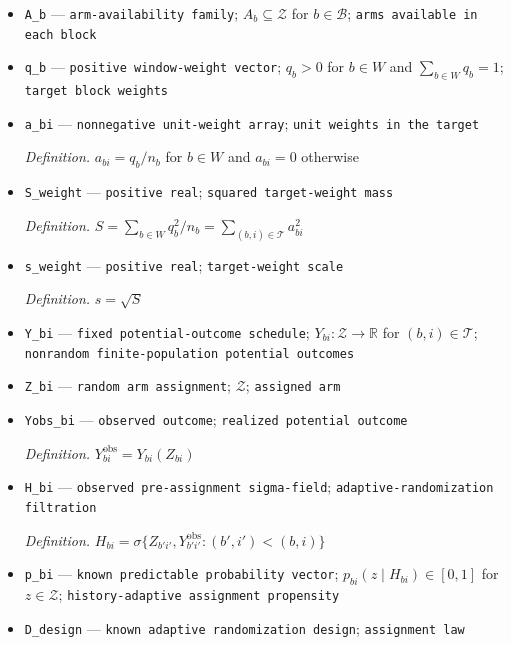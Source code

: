 \documentclass{article}
\begin{document}
\begin{itemize}
  \item \texttt{A\_\allowbreak{}b} --- \texttt{arm-\allowbreak{}availability family}; \(A_b\subseteq\mathcal Z\) for \(b\in\mathcal B\); \texttt{arms available in each block}
  \item \texttt{q\_\allowbreak{}b} --- \texttt{positive window-\allowbreak{}weight vector}; \(q_b>0\) for \(b\in W\) and \(\sum_{b\in W}q_b=1\); \texttt{target block weights}
  \item \texttt{a\_\allowbreak{}bi} --- \texttt{nonnegative unit-\allowbreak{}weight array}; \texttt{unit weights in the target}
  \par\smallskip\noindent\emph{Definition.} \(a_{bi}=q_b/n_b\) for \(b\in W\) and \(a_{bi}=0\) otherwise
  \item \texttt{S\_\allowbreak{}weight} --- \texttt{positive real}; \texttt{squared target-\allowbreak{}weight mass}
  \par\smallskip\noindent\emph{Definition.} \(S=\sum_{b\in W}q_b^2/n_b=\sum_{(b,i)\in\mathcal T}a_{bi}^2\)
  \item \texttt{s\_\allowbreak{}weight} --- \texttt{positive real}; \texttt{target-\allowbreak{}weight scale}
  \par\smallskip\noindent\emph{Definition.} \(s=\sqrt S\)
  \item \texttt{Y\_\allowbreak{}bi} --- \texttt{fixed potential-\allowbreak{}outcome schedule}; \(Y_{bi}:\mathcal Z\to\mathbb R\) for \((b,i)\in\mathcal T\); \texttt{nonrandom finite-\allowbreak{}population potential outcomes}
  \item \texttt{Z\_\allowbreak{}bi} --- \texttt{random arm assignment}; \(\mathcal Z\); \texttt{assigned arm}
  \item \texttt{Yobs\_\allowbreak{}bi} --- \texttt{observed outcome}; \texttt{realized potential outcome}
  \par\smallskip\noindent\emph{Definition.} \(Y^{\mathrm{obs}}_{bi}=Y_{bi}(Z_{bi})\)
  \item \texttt{H\_\allowbreak{}bi} --- \texttt{observed pre-\allowbreak{}assignment sigma-\allowbreak{}field}; \texttt{adaptive-\allowbreak{}randomization filtration}
  \par\smallskip\noindent\emph{Definition.} \(H_{bi}=\sigma\{Z_{b'i'},Y^{\mathrm{obs}}_{b'i'}:(b',i')<(b,i)\}\)
  \item \texttt{p\_\allowbreak{}bi} --- \texttt{known predictable probability vector}; \(p_{bi}(z\mid H_{bi})\in[0,1]\) for \(z\in\mathcal Z\); \texttt{history-\allowbreak{}adaptive assignment propensity}
  \item \texttt{D\_\allowbreak{}design} --- \texttt{known adaptive randomization design}; \texttt{assignment law}

\end{itemize}
\end{document}
